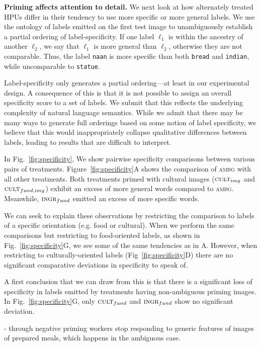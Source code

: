 \documentclass[letterpaper, 11pt, twocolumn]{article}
\begin{document}
\textbf{Priming affects attention to detail.}
We next look at how alternately treated HPUs differ in their tendency to use
more specific or more general labels. We use the ontology of labels emitted
on the first test image to unambiguously establish a partial ordering of 
label-specificity.  If one label $\ell_1$ is within the ancestry of another
$\ell_2$, we say that $\ell_1$ is more general than $\ell_2$, otherwise they
are not comparable.  Thus, the label \texttt{naan} is more 
specific than both \texttt{bread} and \texttt{indian}, while uncomparable to
\texttt{statue}.

Label-specificity only generates a partial ordering---at least in our 
experimental design.  A consequence of this is that it is not possible to
assign an overall specificity score to a set of labels.  We submit that this
reflects the underlying complexity of natural language semantics.  While
we admit that there may be many ways to generate full orderings based on some
notion of label specificity, we believe that this would inappropriately 
collapse qualitative differences between labels, leading to results that are
difficult to interpret.

In Fig.~\ref{fig:specificity}, We show pairwise specificity comparisons 
between various pairs of treatments.  Figure~\ref{fig:specificity}A shows
the comparison of \textsc{ambg} with all other treatments.  Both treatments
primed with cultural images ($\textsc{cult}_{img}$ and 
$\textsc{cult}_{fund, img}$) exhibit an excess of more general words compared
to \textsc{ambg}.  Meanwhile, $\textsc{ingr}_{fund}$ emitted an excess of 
more specific words.

We can seek to explain these observations by restricting the comparison to
labels of a specific orientation (e.g. food or cultural).  When we perform
the same comparisons but restricting to food-oriented labels, as shown in 
Fig.~\ref{fig:specificity}G, we see some of the same tendencies as in A.
However, when restricting to culturally-oriented labels 
(Fig~\ref{fig:specificity}D) there are no significant comparative deviations 
in specificity to speak of.

A first conclusion that we can draw from this is that there is a significant
loss of specificity in labels emitted by treatments having non-ambiguous 
priming images.  In Fig.~\ref{fig:specificity}G, only $\textsc{cult}_{fund}$
and $\textsc{ingr}_{fund}$ show no significant deviation.  

- through negative priming workers stop responding to generic features of images of prepared meals, which happens in the ambiguous case.
\end{document}
